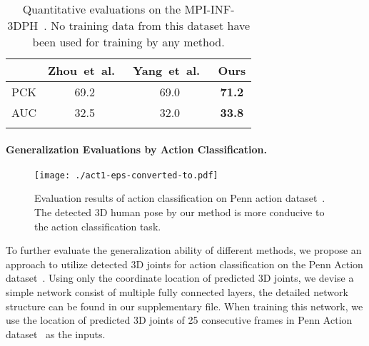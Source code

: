 \documentclass[10pt,twocolumn,letterpaper]{article}
\def\etal{et~al.\xspace}
\begin{document}
\begin{table}[t]
\center
\footnotesize
\caption{Quantitative evaluations on the MPI-INF-3DPH~\cite{mehta2017monocular}. No training data from this dataset have been used for training by any method.}\vspace{2mm}
\begin{tabular}{lccc}
\toprule
                          &   Zhou~\etal~\cite{zhou2017towards}  & Yang~\etal~\cite{yang20183d}         & Ours                \\ \midrule
            PCK           &   69.2                               &   69.0                               &\textbf{71.2}        \\  
            AUC           &   32.5                               &   32.0                               &\textbf{33.8}        \\\bottomrule
\label{exp:mpi-inf}
\end{tabular}
\end{table}


















\paragraph{Generalization Evaluations by Action Classification.}
\begin{figure}[t]
\centering
\texttt{[image: ./act1-eps-converted-to.pdf]}
\caption{Evaluation results of action classification on Penn action dataset~\cite{zhang2013actemes}. The detected 3D human pose by our method is more conducive to the action classification task.}
\label{exp:act_curve}
\vspace{-4mm}
\end{figure}
To further evaluate the generalization ability of different methods, we propose an approach to utilize detected 3D joints for action classification on the Penn Action dataset~\cite{zhang2013actemes}.
Using only the coordinate location of predicted 3D joints, we devise a simple network consist of multiple fully connected layers, the detailed network structure can be found in our supplementary file.
When training this network, we use the location of predicted 3D joints of 25 consecutive frames in Penn Action dataset~\cite{zhang2013actemes} as the inputs.
\end{document}
